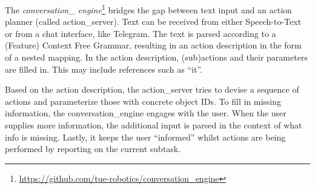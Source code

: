 \label{ssec:conversation}
The \emph{conversation\_ engine}\footnote{\url{https://github.com/tue-robotics/conversation_engine}} bridges the gap between text input and an action planner (called action\_server). Text can be received from either Speech-to-Text or from a chat interface, like Telegram\texttrademark\hspace{0em}. The text is parsed according to a (Feature) Context Free Grammar, resulting in an action description in the form of a nested mapping. In the action description, (sub)actions and their parameters are filled in.
This may include references such as “it”.

Based on the action description, the action\_server tries to devise a sequence of actions and parameterize those with concrete object IDs.
To fill in missing information, the conversation\_engine engages with the user. When the user supplies more information, the additional input is parsed in the context of what info is missing. %
Lastly, it keeps the user “informed” whilst actions are being performed by reporting on the current subtask.
